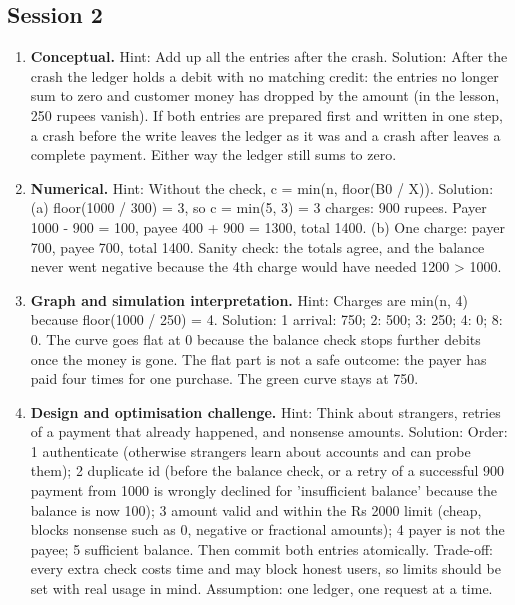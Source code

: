 \documentclass[11pt,a4paper]{article}
\begin{document}
\subsection*{Session 2}
\begin{enumerate}[nosep]
\item \textbf{Conceptual.} Hint: Add up all the entries after the crash. Solution: After the crash the ledger holds a debit with no matching credit: the entries no longer sum to zero and customer money has dropped by the amount (in the lesson, 250 rupees vanish). If both entries are prepared first and written in one step, a crash before the write leaves the ledger as it was and a crash after leaves a complete payment. Either way the ledger still sums to zero.
\item \textbf{Numerical.} Hint: Without the check, c = min(n, floor(B0 / X)). Solution: (a) floor(1000 / 300) = 3, so c = min(5, 3) = 3 charges: 900 rupees. Payer 1000 - 900 = 100, payee 400 + 900 = 1300, total 1400. (b) One charge: payer 700, payee 700, total 1400. Sanity check: the totals agree, and the balance never went negative because the 4th charge would have needed 1200 \textgreater{} 1000.
\item \textbf{Graph and simulation interpretation.} Hint: Charges are min(n, 4) because floor(1000 / 250) = 4. Solution: 1 arrival: 750; 2: 500; 3: 250; 4: 0; 8: 0. The curve goes flat at 0 because the balance check stops further debits once the money is gone. The flat part is not a safe outcome: the payer has paid four times for one purchase. The green curve stays at 750.
\item \textbf{Design and optimisation challenge.} Hint: Think about strangers, retries of a payment that already happened, and nonsense amounts. Solution: Order: 1 authenticate (otherwise strangers learn about accounts and can probe them); 2 duplicate id (before the balance check, or a retry of a successful 900 payment from 1000 is wrongly declined for 'insufficient balance' because the balance is now 100); 3 amount valid and within the Rs 2000 limit (cheap, blocks nonsense such as 0, negative or fractional amounts); 4 payer is not the payee; 5 sufficient balance. Then commit both entries atomically. Trade-off: every extra check costs time and may block honest users, so limits should be set with real usage in mind. Assumption: one ledger, one request at a time.
\end{enumerate}
\end{document}

